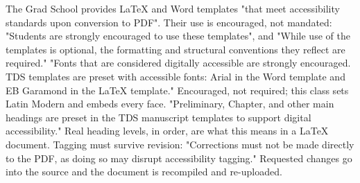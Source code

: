 %
%
%
	{The Grad School provides LaTeX and Word templates "that meet accessibility
	 standards upon conversion to PDF". Their use is encouraged, not mandated:
	 "Students are strongly encouraged to use these templates", and "While use
	 of the templates is optional, the formatting and structural conventions
	 they reflect are required."}
	{"Fonts that are considered digitally accessible are strongly encouraged.
	 TDS templates are preset with accessible fonts: Arial in the Word template
	 and EB Garamond in the LaTeX template." Encouraged, not required; this
	 class sets Latin Modern and embeds every face.}
	{"Preliminary, Chapter, and other main headings are preset in the TDS
	 manuscript templates to support digital accessibility." Real heading
	 levels, in order, are what this means in a LaTeX document.}
	{Tagging must survive revision: "Corrections must not be made directly to
	 the PDF, as doing so may disrupt accessibility tagging." Requested changes
	 go into the source and the document is recompiled and re-uploaded.}

